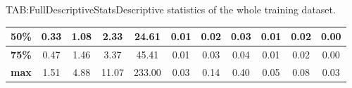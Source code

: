 \begin{landscape}
\begin{table}[Complete Descriptive Statistics]{TAB:FullDescriptiveStats}{Descriptive statistics of the whole training dataset.}
\begin{adjustbox}{width=1\linewidth}
\begin{tabular}{|c|*{10}{c|}}
                \hline
                \textbf{50\%}    & 0.33                            & 1.08                             & 2.33                               & 24.61                         & 0.01                                & 0.02                                 & 0.03                               & 0.01                                    & 0.02                              & 0.00                                       \\
                \hline
                \textbf{75\%}    & 0.47                            & 1.46                             & 3.37                               & 45.41                         & 0.01                                & 0.03                                 & 0.04                               & 0.01                                    & 0.02                              & 0.00                                       \\
                \hline
                \textbf{max}     & 1.51                            & 4.88                             & 11.07                              & 233.00                        & 0.03                                & 0.14                                 & 0.40                               & 0.05                                    & 0.08                              & 0.03                                       \\
                \hline
            \end{tabular}
        \end{adjustbox}
        
        \bigskip


\end{table}
\end{landscape}
